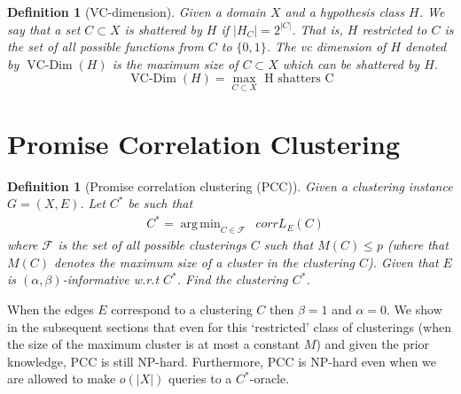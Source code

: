 \documentclass[12pt]{article}
\newtheorem{definition}[theorem]{Definition}
\newcommand{\mc}{\mathcal}
\DeclareMathOperator*{\argmin}{arg\,min}
\DeclareMathOperator*{\vcdim}{VC-Dim}
\begin{document}
\begin{definition}[VC-dimension]
Given a domain $X$ and a hypothesis class $H$. We say that a set $C \subset X$ is shattered by $H$ if $|H_C| = 2^{|C|}$. That is, $H$ restricted to $C$ is the set of all possible functions from $C$ to $\{0, 1\}$. The vc dimension of $H$ denoted by $\vcdim(H)$ is the maximum size of $C \subset X$ which can be shattered by $H$.  
$$\vcdim(H) = \max_{C \subset X} \text{ H shatters C}$$
\end{definition}

\section{Promise Correlation Clustering}
\label{section:PCC}

\begin{definition}[Promise correlation clustering (PCC)]
\label{defn:promiseCorrClustering}
Given a clustering instance $G = (X, E)$. Let $C^*$ be such that
\begin{align}
  &C^* = \argmin_{C \in \mc F} \enspace corrL_{E}(C) \label{eqn:promiseCorrLoss}
\end{align}
where $\mc F$ is the set of all possible clusterings $C$ such that $M(C) \le p$ (where that $M(C)$ denotes the maximum size of a cluster in the clustering $C$). Given that $E$ is $(\alpha, \beta)$-informative w.r.t $C^*$. Find the clustering $C^*$. 
\end{definition}
When the edges $E$ correspond to a clustering $C$ then $\beta = 1$ and $\alpha = 0$. We show in the subsequent sections that even for this `restricted' class of clusterings (when the size of the maximum cluster is at most a constant $M$) and given the prior knowledge, PCC is still NP-hard. Furthermore, PCC is NP-hard even when we are allowed to make $o(|X|)$ queries to a $C^*$-oracle. 
\end{document}
